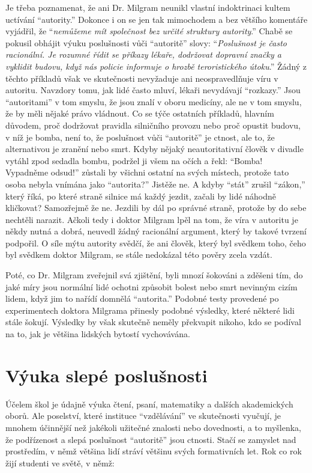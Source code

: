 \documentclass{book}
\begin{document}
Je třeba poznamenat, že ani Dr. Milgram neunikl vlastní indoktrinaci kultem uctívání \enquote{autority.} Dokonce i on se jen tak mimochodem a bez většího komentáře vyjádřil, že \enquote{\emph{nemůžeme mít společnost bez určité struktury autority}.} Chabě se pokusil obhájit výuku poslušnosti vůči \enquote{autoritě} slovy: \enquote{\emph{Poslušnost je často racionální. Je rozumné řídit se příkazy lékaře, dodržovat dopravní značky a vyklidit budovu, když nás policie informuje o hrozbě teroristického útoku}.} Žádný z těchto příkladů však ve skutečnosti nevyžaduje ani neospravedlňuje víru v autoritu. Navzdory tomu, jak lidé často mluví, lékaři nevydávají \enquote{rozkazy.} Jsou \enquote{autoritami} v tom smyslu, že jsou znalí v oboru medicíny, ale ne v tom smyslu, že by měli nějaké právo vládnout. Co se týče ostatních příkladů, hlavním důvodem, proč dodržovat pravidla silničního provozu nebo proč opustit budovu, v níž je bomba, není to, že poslušnost vůči \enquote{autoritě} je ctnost, ale to, že alternativou je zranění nebo smrt. Kdyby nějaký neautoritativní člověk v divadle vytáhl zpod sedadla bombu, podržel ji všem na očích a řekl: \enquote{Bomba! Vypadněme odsud!} zůstali by všichni ostatní na svých místech, protože tato osoba nebyla vnímána jako \enquote{autorita?} Jistěže ne. A kdyby \enquote{stát} zrušil \enquote{zákon,} který říká, po které straně silnice má každý jezdit, začali by lidé náhodně kličkovat? Samozřejmě že ne. Jezdili by dál po správné straně, protože by do sebe nechtěli narazit. Ačkoli tedy i doktor Milgram lpěl na tom, že víra v autoritu je někdy nutná a dobrá, neuvedl žádný racionální argument, který by takové tvrzení podpořil. O síle mýtu autority svědčí, že ani člověk, který byl svědkem toho, čeho byl svědkem doktor Milgram, se stále nedokázal této pověry zcela vzdát.

Poté, co Dr. Milgram zveřejnil svá zjištění, byli mnozí šokováni a zděšeni tím, do jaké míry jsou normální lidé ochotni způsobit bolest nebo smrt nevinným cizím lidem, když jim to nařídí domnělá \enquote{autorita.} Podobné testy provedené po experimentech doktora Milgrama přinesly podobné výsledky, které některé lidi stále šokují. Výsledky by však skutečně neměly překvapit nikoho, kdo se podíval na to, jak je většina lidských bytostí vychovávána.

\section{Výuka slepé poslušnosti}

Účelem škol je údajně výuka čtení, psaní, matematiky a dalších akademických oborů. Ale poselství, které instituce \enquote{vzdělávání} ve skutečnosti vyučují, je mnohem účinnější než jakékoli užitečné znalosti nebo dovednosti, a to myšlenka, že podřízenost a slepá poslušnost \enquote{autoritě} jsou ctnosti. Stačí se zamyslet nad prostředím, v němž většina lidí stráví většinu svých formativních let. Rok co rok žijí studenti ve světě, v němž:
\end{document}
